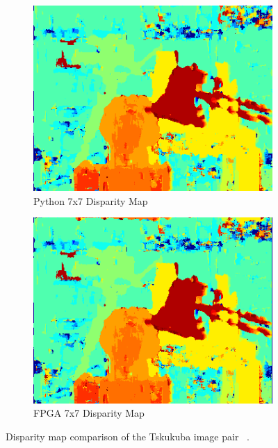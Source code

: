 \begin{figure}
\begin{center}
\begin{subfigure}{0.45\textwidth}
		\includegraphics[width=\textwidth]{figures/tsukuba_7x7_python3.png}
		\caption{Python 7x7 Disparity Map}
		\label{fig:tsukubaPy}
	\end{subfigure}
	\begin{subfigure}{0.45\textwidth}
		\includegraphics[width=\textwidth]{figures/tsukuba_7x7_fpga.png}
		\caption{FPGA 7x7 Disparity Map}
		\label{fig:tsukubaFPGA}
	\end{subfigure}
	\captionfonts
	\caption{Disparity map comparison of the Tskukuba image pair ~\cite{middlebury}.}
	\label{fig:tsukubaDispMap}
\end{center}
\end{figure}

